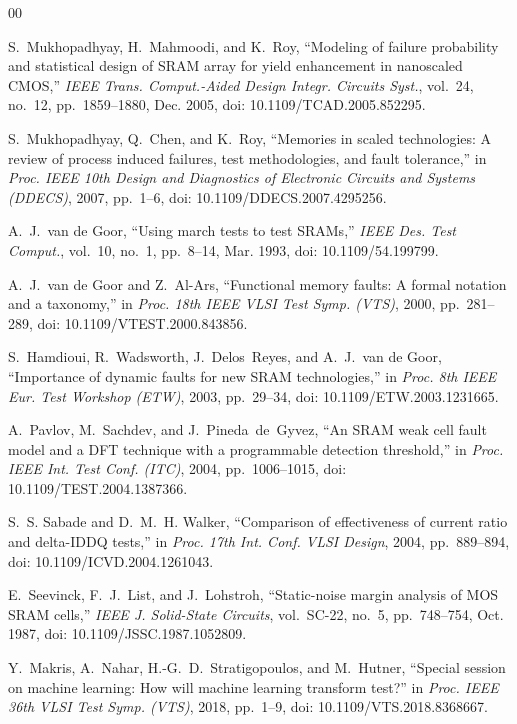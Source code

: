 \documentclass[conference,letterpaper]{IEEEtran}
\begin{document}
\begin{thebibliography}{00}

S.~Mukhopadhyay, H.~Mahmoodi, and K.~Roy, ``Modeling of failure probability and statistical design of SRAM array for yield enhancement in nanoscaled CMOS,'' \emph{IEEE Trans. Comput.-Aided Design Integr. Circuits Syst.}, vol.~24, no.~12, pp.~1859--1880, Dec. 2005, doi: 10.1109/TCAD.2005.852295.

S.~Mukhopadhyay, Q.~Chen, and K.~Roy, ``Memories in scaled technologies: A review of process induced failures, test methodologies, and fault tolerance,'' in \emph{Proc. IEEE 10th Design and Diagnostics of Electronic Circuits and Systems (DDECS)}, 2007, pp.~1--6, doi: 10.1109/DDECS.2007.4295256.

A.~J.~van de Goor, ``Using march tests to test SRAMs,'' \emph{IEEE Des. Test Comput.}, vol.~10, no.~1, pp.~8--14, Mar. 1993, doi: 10.1109/54.199799.

A.~J.~van de Goor and Z.~Al-Ars, ``Functional memory faults: A formal notation and a taxonomy,'' in \emph{Proc. 18th IEEE VLSI Test Symp. (VTS)}, 2000, pp.~281--289, doi: 10.1109/VTEST.2000.843856.

S.~Hamdioui, R.~Wadsworth, J.~Delos~Reyes, and A.~J.~van de Goor, ``Importance of dynamic faults for new SRAM technologies,'' in \emph{Proc. 8th IEEE Eur. Test Workshop (ETW)}, 2003, pp.~29--34, doi: 10.1109/ETW.2003.1231665.

A.~Pavlov, M.~Sachdev, and J.~Pineda~de~Gyvez, ``An SRAM weak cell fault model and a DFT technique with a programmable detection threshold,'' in \emph{Proc. IEEE Int. Test Conf. (ITC)}, 2004, pp.~1006--1015, doi: 10.1109/TEST.2004.1387366.

S.~S. Sabade and D.~M.~H. Walker, ``Comparison of effectiveness of current ratio and delta-IDDQ tests,'' in \emph{Proc. 17th Int. Conf. VLSI Design}, 2004, pp.~889--894, doi: 10.1109/ICVD.2004.1261043.

E.~Seevinck, F.~J.~List, and J.~Lohstroh, ``Static-noise margin analysis of MOS SRAM cells,'' \emph{IEEE J. Solid-State Circuits}, vol.~SC-22, no.~5, pp.~748--754, Oct. 1987, doi: 10.1109/JSSC.1987.1052809.

Y.~Makris, A.~Nahar, H.-G.~D.~Stratigopoulos, and M.~Hutner, ``Special session on machine learning: How will machine learning transform test?'' in \emph{Proc. IEEE 36th VLSI Test Symp. (VTS)}, 2018, pp.~1--9, doi: 10.1109/VTS.2018.8368667.


\end{thebibliography}
\end{document}
